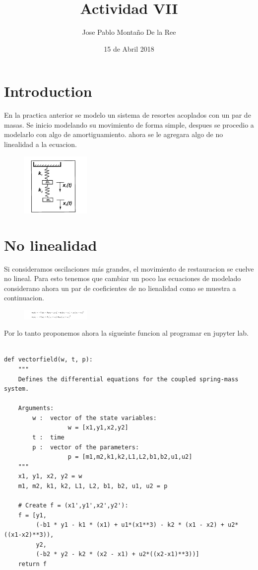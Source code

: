 \documentclass[a4paper]{article}
\title{Actividad VII}
\author{Jose Pablo Montaño De la Ree}
\date{15 de Abril 2018}
\begin{document}
\maketitle


\section{Introduction}

En la practica anterior se modelo un sistema de resortes acoplados con un par de masas. Se inicio modelando su movimiento de forma simple, despues se procedio a modelarlo con algo de amortiguamiento. ahora se le agregara algo de no linealidad a la ecuacion.

\begin{figure}[ht!]
\centering
\includegraphics[width=0.3\textwidth]{E1.png}
\end{figure}

\section{No linealidad}

Si consideramos oscilaciones más grandes, el movimiento de restauracion se cuelve no lineal. Para esto tenemos que cambiar un poco las ecuaciones de modelado considerano ahora un par de coeficientes de no lienalidad como se muestra a continuacion. 

\begin{figure}[ht!]
\centering
\includegraphics[width=0.3\textwidth]{E2.png}
\end{figure}

Por lo tanto proponemos ahora la sigueinte funcion al programar en jupyter lab. 

\begin{verbatim}

def vectorfield(w, t, p):
    """
    Defines the differential equations for the coupled spring-mass system.

    Arguments:
        w :  vector of the state variables:
                  w = [x1,y1,x2,y2]
        t :  time
        p :  vector of the parameters:
                  p = [m1,m2,k1,k2,L1,L2,b1,b2,u1,u2]
    """
    x1, y1, x2, y2 = w
    m1, m2, k1, k2, L1, L2, b1, b2, u1, u2 = p

    # Create f = (x1',y1',x2',y2'):
    f = [y1,
         (-b1 * y1 - k1 * (x1) + u1*(x1**3) - k2 * (x1 - x2) + u2*((x1-x2)**3)),
         y2,
         (-b2 * y2 - k2 * (x2 - x1) + u2*((x2-x1)**3))]
    return f

\end{verbatim}
\end{document}
